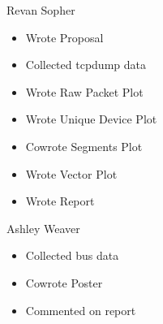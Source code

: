 \documentclass[12pt,journal,compsoc]{IEEEtran} %
\begin{document}
Revan Sopher
\begin{itemize}
\item Wrote Proposal
\item Collected tcpdump data
\item Wrote Raw Packet Plot
\item Wrote Unique Device Plot
\item Cowrote Segments Plot
\item Wrote Vector Plot
\item Wrote Report
\end{itemize}
Ashley Weaver
\begin{itemize}
\item Collected bus data
\item Cowrote Poster
\item Commented on report
\end{itemize}

\clearpage
\end{document}
